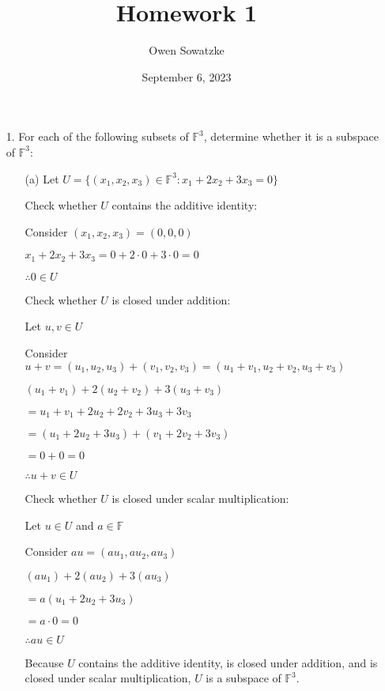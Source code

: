 \documentclass{article}
\title{Homework 1}
\author{Owen Sowatzke}
\date{September 6, 2023}
\begin{document}
	\setlength{\abovedisplayskip}{0pt}
	\setlength{\belowdisplayskip}{0pt}
		\setlength{\abovedisplayshortskip}{0pt}
	\setlength{\belowdisplayshortskip}{0pt}
	\doublespacing
	\maketitle
	
	\begin{enumerate}[nolistsep]
	
		\item[1.] For each of the following subsets of $\mathbb{F}^3$, determine whether it is a subspace of $\mathbb{F}^3$:
		
		\begin{enumerate}[nolistsep]
			
			\item[(a)] Let $U = {\{(x_1, x_2, x_3) \in \mathbb{F}^3 : x_1 + 2x_2 + 3x_3 = 0 \}}$
			
			Check whether $U$ contains the additive identity:
			
			Consider $(x_1, x_2, x_3) = (0, 0, 0)$
			
			$x_1 + 2x_2 + 3x_3 = 0 + 2 \cdot 0 + 3 \cdot 0 = 0$
			
			$\therefore 0 \in U$
			
			Check whether $U$ is closed under addition:
			
			Let $u,v \in U$
			
			Consider $u + v = (u_1, u_2, u_3) + (v_1, v_2, v_3) = (u_1 + v_1, u_2 + v_2, u_3 + v_3)$
			
			$(u_1 + v_1) + 2(u_2 + v_2) + 3(u_3 + v_3)$
			
			$ = u_1 + v_1 + 2u_2 + 2v_2 + 3u_3 + 3v_3$
			
			$ = (u_1 + 2u_2 + 3u_3) + (v_1 + 2v_2 + 3v_3)$
			
			$ = 0 + 0 = 0$
			
			$\therefore u + v \in U$
			
			Check whether $U$ is closed under scalar multiplication:
			
			Let $u \in U$ and $a \in \mathbb{F}$
			
			Consider $au = (au_1, au_2, au_3)$
			
			$(au_1) + 2(au_2) + 3(au_3)$
			
			$ = a(u_1 + 2u_2 + 3u_3)$
			
			$ = a \cdot 0 = 0$
			
			$\therefore au \in U$
			
			Because $U$ contains the additive identity, is closed under addition, and is closed under scalar multiplication, $U$ is a subspace of $\mathbb{F}^3$.
			

\end{enumerate}
\end{enumerate}
\end{document}
